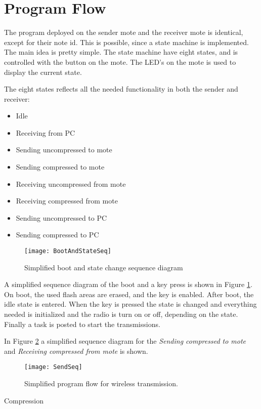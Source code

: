 \section{Program Flow}
The program deployed on the sender mote and the receiver mote is identical, except for their note id. This is possible, since a state machine is implemented. The main idea is pretty simple. The state machine have eight states, and is controlled with the button on the mote. The LED's on the mote is used to display the current state.


The eight states reflects all the needed functionality in both the sender and receiver:
\begin{itemize}
\item Idle
\item Receiving from PC
\item Sending uncompressed to mote
\item Sending compressed to mote
\item Receiving uncompressed from mote
\item Receiving compressed from mote
\item Sending uncompressed to PC
\item Sending compressed to PC
\end{itemize}

\begin{figure}[H]
\centering
\texttt{[image: BootAndStateSeq]}
\caption{Simplified boot and state change sequence diagram}
\label{fig:BootAndState}
\end{figure}

A simplified sequence diagram of the boot and a key press is shown in Figure \ref{fig:BootAndState}. On boot, the used flash areas are erased, and the key is enabled. After boot, the idle state is entered. When the key is pressed the state is changed and everything needed is initialized and the radio is turn on or off, depending on the state. Finally a task is posted to start the transmissions.

In Figure \ref{fig:SendReceiveSeq} a simplified sequence diagram for the \emph{Sending compressed to mote} and \emph{Receiving compressed from mote} is shown.



\begin{figure}[H]
\centering
\texttt{[image: SendSeq]}
\caption{Simplified program flow for wireless transmission.}
\label{fig:SendReceiveSeq}
\end{figure}

Compression